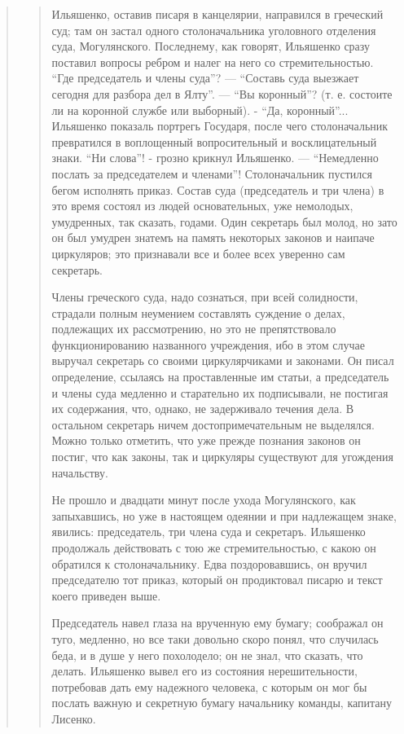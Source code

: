 \begin{quote}
\begin{quote}
Ильяшенко, оставив писаря в канцелярии, направился
в греческий суд; там он застал одного столоначальника
уголовного отделения суда, Могулянского. Последнему, как
говорят, Ильяшенко сразу поставил вопросы ребром и
налег на него со стремительностью. ``Где председатель и
члены суда''? — ``Составь суда выезжает сегодня для разбора
дел в Ялту''. — ``Вы коронный''? (т. е. состоите ли на 
коронной службе или выборный). - ``Да, коронный''... Ильяшенко
показаль портрегь Государя, после чего столоначальник
превратился в воплощенный вопросительный и восклицательный знаки. ``Ни слова''! - грозно крикнул Ильяшенко. —
``Немедленно послать за председателем и членами''! Столоначальник пустился
бегом исполнять приказ. Состав суда (председатель и три члена) в это
время состоял из людей основательных, уже немолодых, умудренных, так
сказать, годами. Один секретарь был молод, но зато он был умудрен
знатемъ на память некоторых законов и наипаче циркуляров; это
признавали все и более всех уверенно сам секретарь.

Члены греческого суда, надо сознаться, при всей солидности, страдали полным
неумением составлять суждение о делах, подлежащих их рассмотрению, но
это не препятствовало функционированию названного учреждения, ибо в
этом случае выручал секретарь со своими циркулярчиками и законами. Он
писал определение, ссылаясь на проставленные им статьи, а председатель
и члены суда медленно и старательно их подписывали, не постигая их
содержания, что, однако, не задерживало течения дела. В остальном
секретарь ничем достопримечательным не выделялся.  Можно только
отметить, что уже прежде познания законов он постиг, что как законы,
так и циркуляры существуют для угождения начальству.

Не прошло и двадцати минут после ухода Могулянского, как запыхавшись, но уже в
настоящем одеянии и при надлежащем знаке, явились: председатель, три
члена суда и секретаръ. Ильяшенко продолжаль действовать с тою же
стремительностью, с какою он обратился к столоначальнику. Едва
поздоровавшись, он вручил председателю тот приказ, который он
продиктовал писарю и текст коего приведен выше.

Председатель навел глаза на врученную ему бумагу; соображал он туго, медленно, но все таки довольно
скоро понял, что случилась беда, и в душе у него похолодело;
он не знал, что сказать, что делать. Ильяшенко вывел
его из состояния нерешительности, потребовав дать ему
надежного человека, с которым он мог бы послать важную и секретную бумагу
начальнику команды, капитану Лисенко.


\end{quote}
\end{quote}
